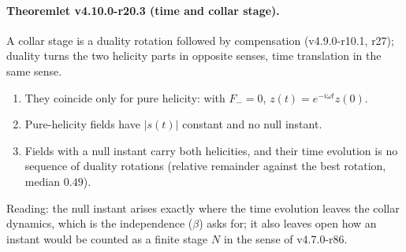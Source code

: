 \paragraph{Theoremlet v4.10.0-r20.3 (time and collar stage).}
A collar stage is a duality rotation followed by compensation (v4.9.0-r10.1, r27); duality turns the two helicity parts in
opposite senses, time translation in the same sense.
\begin{enumerate}[leftmargin=2em]
\item[(a)] They coincide only for pure helicity: with \(F_-=0\), \(z(t)=e^{-i\omega t}z(0)\).
\item[(b)] Pure-helicity fields have \(|s(t)|\) constant and no null instant.
\item[(c)] Fields with a null instant carry both helicities, and their time evolution is no sequence of duality rotations (relative
remainder against the best rotation, median \(0.49\)).
\end{enumerate}
Reading: the null instant arises exactly where the time evolution leaves the collar dynamics, which is the independence (\(\beta\))
asks for; it also leaves open how an instant would be counted as a finite stage \(N\) in the sense of v4.7.0-r86.


